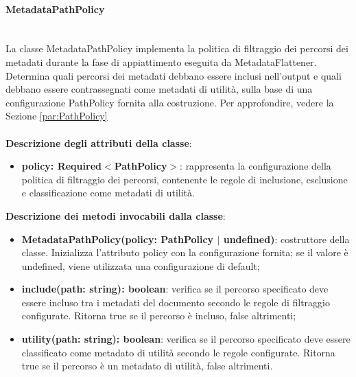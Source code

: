 \documentclass[a4paper,12pt]{article}
\begin{document}
{                \noindent \paragraph{MetadataPathPolicy}\label{par:MetadataPathPolicy}\mbox{}\\
                La classe MetadataPathPolicy implementa la politica di filtraggio dei percorsi dei metadati durante la fase di appiattimento eseguita da MetadataFlattener. Determina quali percorsi dei metadati debbano essere inclusi nell'output e quali debbano essere contrassegnati come metadati di utilità, sulla base di una configurazione PathPolicy fornita alla costruzione. Per approfondire, vedere la Sezione \ref{par:PathPolicy}\\
                \\
                \textbf{Descrizione degli attributi della classe}:
                \begin{itemize}
                    \item \textbf{policy: Required$<$PathPolicy$>$}: rappresenta la configurazione della politica di filtraggio dei percorsi, contenente le regole di inclusione, esclusione e classificazione come metadati di utilità.
                \end{itemize}
 
                \noindent \textbf{Descrizione dei metodi invocabili dalla classe}:
                \begin{itemize}
                    \item \textbf{MetadataPathPolicy(policy: PathPolicy $|$ undefined)}: costruttore della classe. Inizializza l'attributo policy con la configurazione fornita; se il valore è undefined, viene utilizzata una configurazione di default;
                    \item \textbf{include(path: string): boolean}: verifica se il percorso specificato deve essere incluso tra i metadati del documento secondo le regole di filtraggio configurate. Ritorna true se il percorso è incluso, false altrimenti;
                    \item \textbf{utility(path: string): boolean}: verifica se il percorso specificato deve essere classificato come metadato di utilità secondo le regole configurate. Ritorna true se il percorso è un metadato di utilità, false altrimenti.
                \end{itemize}
 
}
\end{document}
